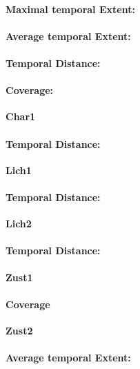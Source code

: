 \begin{table}[ht]
\paragraph{Maximal temporal Extent:}
\paragraph{Average temporal Extent:}
\paragraph{Temporal Distance:}
\paragraph{Coverage:}

\large
\centerline{\textbf{Char1}}
\normalsize

\paragraph{Temporal Distance:}

\large
\centerline{\textbf{Lich1}}
\normalsize

\paragraph{Temporal Distance:}

\large
\centerline{\textbf{Lich2}}
\normalsize

\paragraph{Temporal Distance:}

\large
\centerline{\textbf{Zust1}}
\normalsize

\paragraph{Coverage}

\large
\centerline{\textbf{Zust2}}
\normalsize

\paragraph{Average temporal Extent:}

\end{table}
